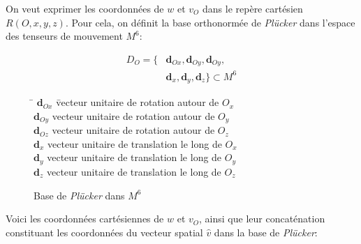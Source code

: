 \documentclass{report}
\begin{document}
On veut exprimer les coordonnées de $w$ et $v_{O}$ dans le repère cartésien $R(O,x,y,z)$. Pour cela, on définit la base orthonormée de \emph{Plücker} dans l'espace des tenseurs de mouvement $M^{6}$:\\

\begin{figure}[H]
{%
}{%
  \begin{align*}
  D_{O} = \lbrace &\textbf{d}_{Ox}, \textbf{d}_{Oy}, \textbf{d}_{Oy}, \\
  &\textbf{d}_{x}, \textbf{d}_{y}, \textbf{d}_{z} \rbrace \subset M^{6}
  \end{align*}
}{%
  \begin{tabbing}
  \= $\textbf{d}_{Ox}$ \= vecteur unitaire de rotation autour de $O_{x}$\\
  \> $\textbf{d}_{Oy}$ \> vecteur unitaire de rotation autour de $O_{y}$\\
  \> $\textbf{d}_{Oz}$ \> vecteur unitaire de rotation autour de $O_{z}$\\
  \> $\textbf{d}_{x}$  \> vecteur unitaire de translation le long de $O_{x}$\\
  \> $\textbf{d}_{y}$  \> vecteur unitaire de translation le long de $O_{y}$\\
  \> $\textbf{d}_{z}$  \> vecteur unitaire de translation le long de $O_{z}$\\
  \end{tabbing}
}
\caption{Base de \emph{Plücker} dans $M^{6}$}
\label{fig_basePlucker}
\end{figure}

Voici les coordonnées cartésiennes de $w$ et $v_{O}$, ainsi que leur concaténation constituant les coordonnées du vecteur spatial $\widehat{v}$ dans la base de \emph{Plücker}:\\
\end{document}
